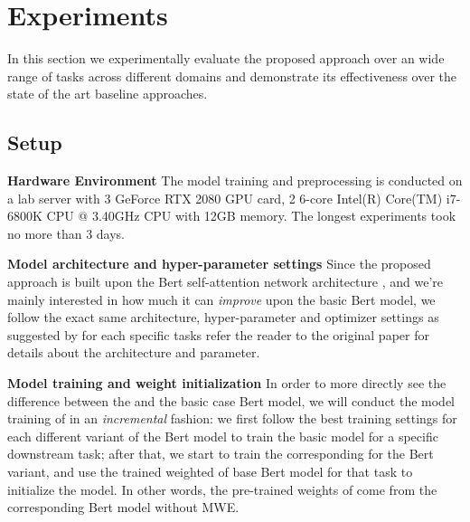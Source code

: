 \section{Experiments}\label{sec:experiments}

In this section we experimentally evaluate the proposed approach over an wide range of tasks across different domains and demonstrate its effectiveness over the state of the art baseline approaches.




\subsection{Setup}

\noindent \textbf{Hardware Environment}
The model training and preprocessing is conducted on a lab server with 3 
GeForce RTX 2080 GPU card, 2 6-core Intel(R) Core(TM) i7-6800K CPU @ 3.40GHz CPU with 12GB memory. The longest experiments took no more than 3 days.


\noindent \textbf{Model architecture and hyper-parameter settings}
Since the proposed \BertMWE approach is built upon the Bert self-attention network architecture \cite{devlin2018bert},
and 
we're mainly interested in how much it can \textit{improve} upon the basic Bert model, 
we follow the exact same architecture, hyper-parameter and optimizer settings as suggested by 
\cite{devlin2018bert} for each specific tasks 
refer the reader to the original paper for details about the architecture and parameter.

\noindent \textbf{Model training and weight initialization}
In order to more directly see the difference between the \BertMWE and the basic case Bert model, we will conduct the model training of \BertMWE in an \textit{incremental} fashion:
we first follow the best training settings for each different variant of the Bert model  to train the basic model for a specific downstream task; after that, we start to train the corresponding \BertMWE 
for the Bert variant, and use the trained weighted of base Bert model for that task to initialize the \BertMWE model. In other words, the pre-trained weights of \BertMWE come from the corresponding Bert model without MWE.

